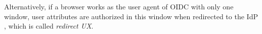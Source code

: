 Alternatively, if a browser works as the user agent of OIDC with only one window,
        user attributes are authorized in this window when redirected to the IdP \cite{OpenIDConnect,rfc6749,GoogleIdIntegrate}, 
        which is called \emph{redirect UX}.


\begin{table*}[tb]
    \caption{Privacy-preserving solutions of SSO and identity federation}
\end{table*}
